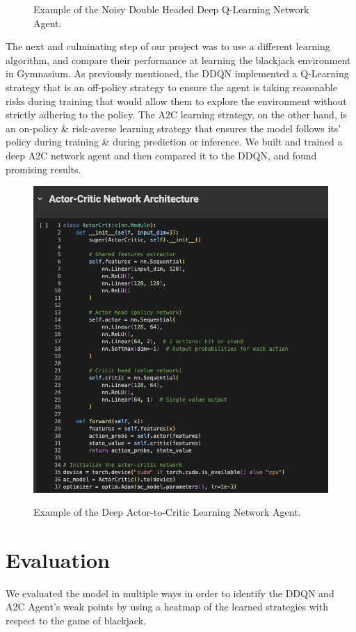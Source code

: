 \documentclass[compsoc]{IEEEtran}
\begin{document}
{\begin{figure}[h]
\caption{Example of the Noisy Double Headed Deep Q-Learning Network Agent.}
\end{figure}
The next and culminating step of our project was to use a different learning algorithm, and compare their performance at learning the blackjack environment in Gymnasium. As previously mentioned, the  DDQN implemented a Q-Learning strategy that is an off-policy strategy to ensure the agent is taking reasonable risks during training that would allow them to explore the environment without strictly adhering to the policy. The A2C learning strategy, on the other hand, is an on-policy \& risk-averse learning strategy that ensures the model follows its' policy during training \& during prediction or inference. We built and trained a deep A2C network agent and then compared it to the DDQN, and found promising results.
\begin{figure}[h]
{\includegraphics[scale=0.28]{./fig/AC2.png}}
\caption{Example of the Deep Actor-to-Critic Learning Network Agent.}
\end{figure}

\section{Evaluation}\label{sec:eval}
We evaluated the model in multiple ways in order to identify the DDQN and A2C Agent's weak points by using a heatmap of the learned strategies with respect to the game of blackjack.

}
\end{document}
